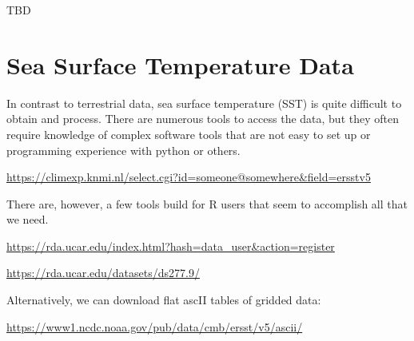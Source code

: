 \documentclass{article}\usepackage[]{graphicx}\usepackage[]{color}
\begin{document}
TBD

\section{Sea Surface Temperature Data}

In contrast to terrestrial data, sea surface temperature (SST) is quite difficult to obtain and process. There are numerous tools to access the data, but they often require knowledge of complex software tools that are not easy to set up or programming experience with python or others.

\url{https://climexp.knmi.nl/select.cgi?id=someone@somewhere&field=ersstv5}

There are, however, a few tools build for R users that seem to accomplish all that we need. 

\url{https://rda.ucar.edu/index.html?hash=data_user&action=register}

\url{https://rda.ucar.edu/datasets/ds277.9/}

Alternatively, we can download flat ascII tables of gridded data:

\url{https://www1.ncdc.noaa.gov/pub/data/cmb/ersst/v5/ascii/}
\end{document}
